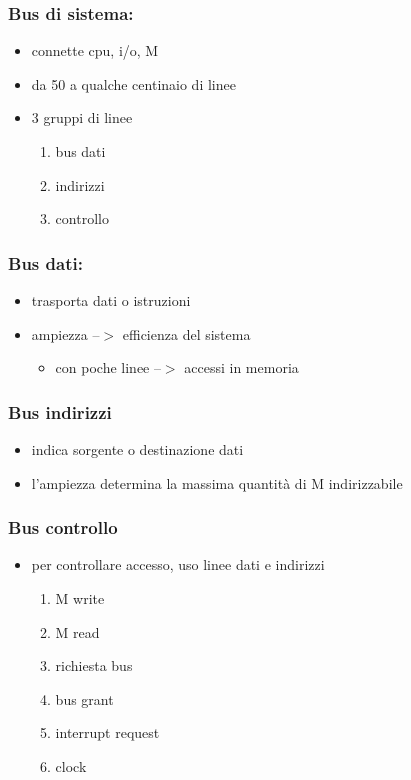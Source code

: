 \documentclass[12pt, a4paper]{article}
\begin{document}
\subsubsection{Bus di sistema:}
\begin{itemize}
	\item connette cpu, i/o, M
	\item da 50 a qualche centinaio di linee
	\item 3 gruppi di linee
	\begin{enumerate}
		\item bus dati
		\item indirizzi
		\item controllo
	\end{enumerate}
\end{itemize}

\subsubsection{Bus dati:}
\begin{itemize}
	\item trasporta dati o istruzioni
	\item ampiezza --$ > $ efficienza  del sistema
	\begin{itemize}
		\item con poche linee --$>$ accessi in memoria
	\end{itemize}
\end{itemize}

\subsubsection{Bus indirizzi}
\begin{itemize}
	\item indica sorgente o destinazione dati
	\item l'ampiezza determina la massima quantità di M indirizzabile
\end{itemize}

\subsubsection{Bus controllo}
\begin{itemize}
	\item per controllare accesso, uso linee dati e indirizzi
	\begin{enumerate}
		\item M write
		\item M read
		\item richiesta bus
		\item bus grant
		\item interrupt request
		\item clock
	\end{enumerate}
\end{itemize}
\end{document}
